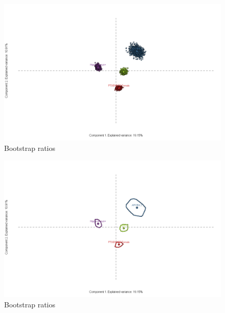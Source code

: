 \documentclass[
  ignorenonframetext,
]{beamer}
\begin{document}
\begin{frame}

\begin{figure}
\centering
\includegraphics{../Images/boot4.png}
\caption{Bootstrap ratios}
\end{figure}

\end{frame}

\begin{frame}

\begin{figure}
\centering
\includegraphics{../Images/boot5.png}
\caption{Bootstrap ratios}
\end{figure}

\end{frame}
\end{document}
